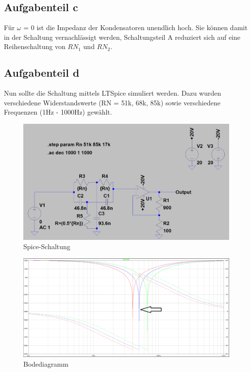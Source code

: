 \documentclass[%
  a4paper, %
  12pt, %
   article, %
  titlepage
]{scrartcl}
\begin{document}
\subsection{Aufgabenteil c}

Für $\omega$ = 0 ist die Impedanz der Kondensatoren unendlich hoch. Sie können damit in der Schaltung vernachlässigt werden, Schaltungsteil A reduziert sich auf eine Reihenschaltung von 
$RN_{1}$ und $RN_{2}$.

\clearpage

\subsection{Aufgabenteil d}

Nun sollte die Schaltung mittels LTSpice simuliert werden. Dazu wurden verschiedene Widerstandswerte
(RN = 51k, 68k, 85k) sowie verschiedene Frequenzen (1Hz - 1000Hz) gewählt.

\begin{figure}[h]
\includegraphics[width=\textwidth]{schematic2.png}
\caption{Spice-Schaltung}
\label{fig1}
\end{figure}

\clearpage

\begin{figure}[h]
\includegraphics[width=\textwidth]{plot1.png}
\caption{Bodediagramm}
\label{fig2}
\end{figure}
\end{document}
